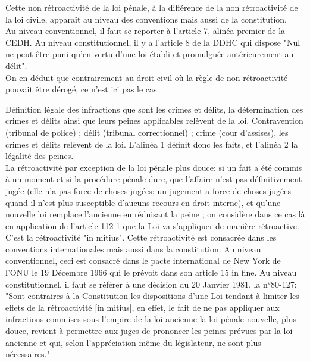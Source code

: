 Cette non rétroactivité de la loi pénale, à la différence de la non rétroactivité de la loi civile, apparaît au niveau des conventions mais aussi de la constitution. \\
Au niveau conventionnel, il faut se reporter à l'article 7, alinéa premier de la CEDH. Au niveau constitutionnel, il y a l'article 8 de la DDHC qui dispose "Nul ne peut être puni qu'en vertu d'une loi établi et promulguée antérieurement au délit". \\ 
On en déduit que contrairement au droit civil où la règle de non rétroactivité pouvait être dérogé, ce n'est ici pas le cas. 


Définition légale des infractions que sont les crimes et délits, la détermination des crimes et délits ainsi que leurs peines applicables relèvent de la loi. Contravention (tribunal de police) ; délit (tribunal correctionnel) ; crime (cour d'assises), les crimes et délits relèvent de la loi. L'alinéa 1 définit donc les faits, et l'alinéa 2 la légalité des peines. \\


La rétroactivité par exception de la loi pénale plus douce: si un fait a été commis à un moment et si la procédure pénale dure, que l'affaire n'est pas définitivement jugée (elle n'a pas force de choses jugées: un jugement a force de choses jugées quand il n'est plus susceptible d'aucuns recours en droit interne), et qu'une nouvelle loi remplace l'ancienne en réduisant la peine ; on considère dans ce cas là en application de l'article 112-1 que la Loi va s'appliquer de manière rétroactive. \\
C'est la rétroactivité "in mitius". Cette rétroactivité est consacrée dans les conventions internationales mais aussi dans la constitution. Au niveau conventionnel, ceci est consacré dans le pacte international de New York de l'ONU le 19 Décembre 1966 qui le prévoit dans son article 15 in fine. Au niveau constitutionnel, il faut se référer à une décision du 20 Janvier 1981, la n°80-127: "Sont contraires à la Constitution les dispositions d'une Loi tendant à limiter les effets de la rétroactivité [in mitius], en effet, le fait de ne pas appliquer aux infractions commises sous l'empire de la loi ancienne la loi pénale nouvelle, plus douce, revient à permettre aux juges de prononcer les peines prévues par la loi ancienne et qui, selon l'appréciation même du législateur, ne sont plus nécessaires."


